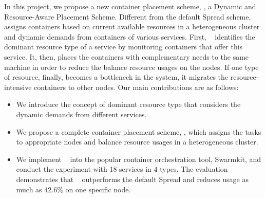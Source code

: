 In this project, we propose a new container placement scheme, \sol, a Dynamic
and Resource-Aware Placement Scheme. Different from the default Spread scheme, \sol~ assigns containers based on current available 
resources in a heterogeneous cluster and dynamic demands from containers of various services. First, \sol~ identifies
the dominant resource type of a service by monitoring containers that offer this service. It, then, places the containers with 
complementary needs to the same machine in order to reduce the balance resource usages on the nodes. 
If one type of resource, finally, becomes a bottleneck in the system, it migrates the resource-intensive containers to other nodes.
Our main contributions are as follows:
\begin{itemize}
 \item We introduce the concept of dominant resource type that considers the dynamic demands from different services. 
 \item We propose a complete container placement scheme, \sol, which assigns the tasks to appropriate nodes and balance resource usages
 in a heterogeneous cluster.
 \item We implement \sol~ into the popular container orchestration tool, Swarmkit, and conduct the experiment with 18 services in 4 types. 
 The evaluation demonstrates that \sol~ outperforms the default Spread and reduces usage as much as 42.6\% on one specific node. 
 
\end{itemize}

